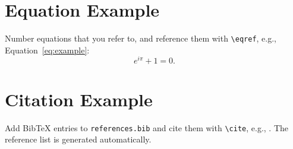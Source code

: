 \section{Equation Example}

Number equations that you refer to, and reference them with
\verb|\eqref|, e.g., Equation~\eqref{eq:example}:
\begin{equation}
  \label{eq:example}
  e^{i\pi} + 1 = 0.
\end{equation}

\section{Citation Example}

Add BibTeX entries to \texttt{references.bib} and cite them with
\verb|\cite|, e.g., \cite{lamport1994latex,knuth1984texbook}. The reference
list is generated automatically.
